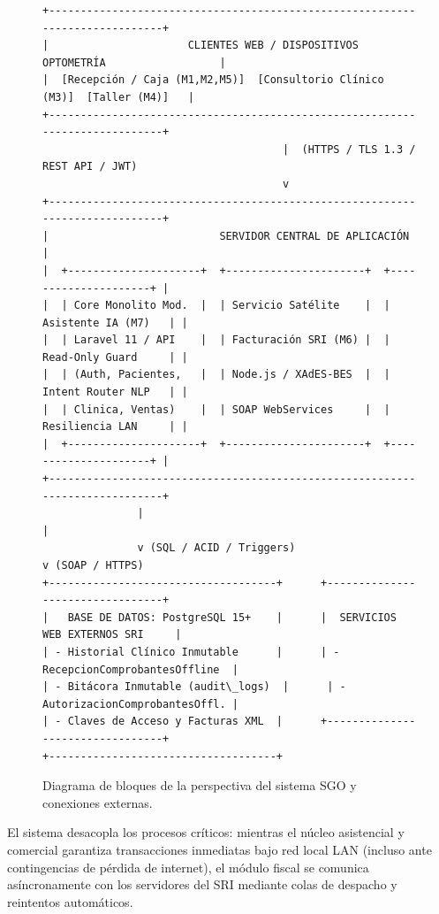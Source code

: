 \documentclass[12pt,a4paper]{report}
\begin{document}
\begin{figure}[H]
\centering
\begin{tcolorbox}[colback=white,colframe=primaryBlue,title=\textbf{Arquitectura Conceptual y Límites Operativos del Sistema SGO},width=0.98\textwidth]
\centering
\small
\begin{verbatim}
+-----------------------------------------------------------------------------+
|                      CLIENTES WEB / DISPOSITIVOS OPTOMETRÍA                  |
|  [Recepción / Caja (M1,M2,M5)]  [Consultorio Clínico (M3)]  [Taller (M4)]   |
+-----------------------------------------------------------------------------+
                                      |  (HTTPS / TLS 1.3 / REST API / JWT)
                                      v
+-----------------------------------------------------------------------------+
|                           SERVIDOR CENTRAL DE APLICACIÓN                    |
|  +---------------------+  +----------------------+  +---------------------+ |
|  | Core Monolito Mod.  |  | Servicio Satélite    |  | Asistente IA (M7)   | |
|  | Laravel 11 / API    |  | Facturación SRI (M6) |  | Read-Only Guard     | |
|  | (Auth, Pacientes,   |  | Node.js / XAdES-BES  |  | Intent Router NLP   | |
|  | Clinica, Ventas)    |  | SOAP WebServices     |  | Resiliencia LAN     | |
|  +---------------------+  +----------------------+  +---------------------+ |
+-----------------------------------------------------------------------------+
               |                                             |
               v (SQL / ACID / Triggers)                     v (SOAP / HTTPS)
+------------------------------------+      +---------------------------------+
|   BASE DE DATOS: PostgreSQL 15+    |      |  SERVICIOS WEB EXTERNOS SRI     |
| - Historial Clínico Inmutable      |      | - RecepcionComprobantesOffline  |
| - Bitácora Inmutable (audit\_logs)  |      | - AutorizacionComprobantesOffl. |
| - Claves de Acceso y Facturas XML  |      +---------------------------------+
+------------------------------------+
\end{verbatim}
\end{tcolorbox}
\caption{Diagrama de bloques de la perspectiva del sistema SGO y conexiones externas.}
\label{fig:perspectiva}
\end{figure}

El sistema desacopla los procesos críticos: mientras el núcleo asistencial y comercial garantiza transacciones inmediatas bajo red local LAN (incluso ante contingencias de pérdida de internet), el módulo fiscal se comunica asíncronamente con los servidores del SRI mediante colas de despacho y reintentos automáticos.
\end{document}
